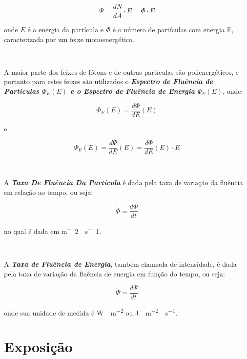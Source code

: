 \documentclass[11pt,a4paper]{article}
\begin{document}
			\begin{equation}
			\Psi = \frac{d N}{d A} \cdot E = \Phi \cdot E
			\end{equation}
      
      	\noindent onde $E$ é a energia da partícula e $\Phi$ é o número de partículas com energia E, caracterizada por um feixe monoenergético. 

    	\

    	A maior parte dos feixes de fótons e de outras partículas são polienergéticos, e portanto para estes feixes são utilizados o \textit{\textbf{\textcolor{CarnationPink}{Espectro de Fluência de Partículas $\Phi_E(E)$ e o Espectro de Fluência de Energia $\Psi_E(E)$}}}, onde:

			\begin{equation}
			\Phi_E(E) = \frac{d \Phi}{dE}(E)
			\end{equation}

      	\noindent e

			\begin{equation}
			\Psi_E(E) = \frac{d \Psi}{d E}(E) = \frac{d \Phi}{dE}(E) \cdot E 
			\end{equation}

		\

		A \textit{\textbf{\textcolor{CarnationPink}{Taxa De Fluência Da Partícula}}} é dada pela taxa de variação da fluência em relação ao tempo, ou seja:

			\begin{equation}
				\dot{\Phi} = \frac{d \Phi}{d t}
			\end{equation}

		\noindent no qual é dada em \unit{m^-2 \cdot s^-1}.

		\

		A \textit{\textbf{\textcolor{CarnationPink}{Taxa de Fluência de Energia}}}, também chamada de intensidade, é dada pela taxa de variação da fluência de energia em função do tempo, ou seja:

			\begin{equation}
				\dot{\Psi} = \frac{d \Psi}{d t}
			\end{equation}

		\noindent onde sua unidade de medida é \unit{W \cdot m^{-2}} ou \unit{J \cdot m^{-2} \cdot s^{-1}}.
		
	\section{Exposição}
\end{document}
